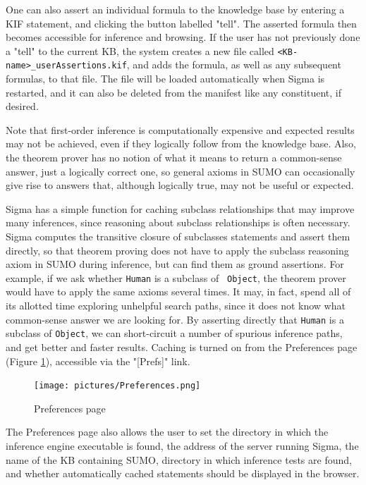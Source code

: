 \documentclass{book}
\begin{document}
One can also assert an individual formula to the knowledge base by entering a
KIF statement, and clicking the button labelled "tell".  The asserted
formula then becomes accessible for inference and browsing.  If the user has not
previously done a "tell" to the current KB, the system creates a new file
called \texttt{<KB-name>_userAssertions.kif}, and adds the formula, as well as any
subsequent formulas, to that file.  The file will be loaded automatically when
Sigma is restarted, and it can also be deleted from the manifest like any
constituent, if desired.

Note that first-order inference is computationally expensive and expected
results may not be achieved, even if they logically follow from the knowledge
base.  Also, the theorem prover has no notion of what it means to return a
common-sense answer, just a logically correct one, so general axioms in SUMO can
occasionally give rise to answers that, although logically true, may not be
useful or expected.

Sigma has a simple function for caching subclass relationships that may improve
many inferences, since reasoning about subclass relationships is often
necessary.  Sigma computes the transitive closure of subclasses statements
and assert them directly, so that theorem proving does not have to apply the subclass
reasoning axiom in SUMO during inference, but can find them as ground
assertions.  For example, if we ask whether {\tt Human} is a subclass of {\tt
Object}, the theorem prover would have to apply the same axioms several times.  It may, in
fact, spend all of its allotted time exploring unhelpful search paths, since it
does not know what common-sense answer we are looking for.  By asserting
directly that {\tt Human} is a subclass of {\tt Object}, we can short-circuit a
number of spurious inference paths, and get better and faster results.
Caching is turned on from the Preferences page
(Figure \ref{fig:Preferences}), accessible via the
"[Prefs]" link.

\begin{figure}
  \centering
  \texttt{[image: pictures/Preferences.png]}
  \caption{Preferences page}
  \label{fig:Preferences}
\end{figure}

\begin{sloppypar}
The Preferences page also allows the user to set the directory in which the
inference engine executable is found, the address of the server running Sigma,
the name of the KB containing SUMO, directory in which inference tests are
found, and whether automatically cached statements should be displayed in the
browser.
\end{sloppypar}
\end{document}

